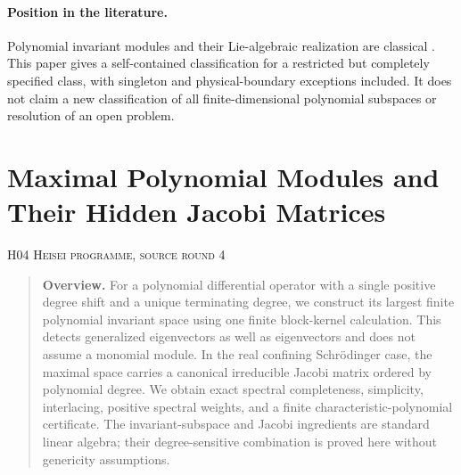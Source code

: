 \documentclass[11pt,a4paper]{article}
\theoremstyle{definition}\newtheorem{definition}[theorem]{Definition}
\theoremstyle{remark}\newtheorem{remark}[theorem]{Remark}
\numberwithin{equation}{section}
\begin{document}
\paragraph{Position in the literature.} Polynomial invariant modules and their Lie-algebraic realization are classical \cite{ref083,ref084}. This paper gives a self-contained classification for a restricted but completely specified class, with singleton and physical-boundary exceptions included. It does not claim a new classification of all finite-dimensional polynomial subspaces or resolution of an open problem.




\clearpage
\section[H04 --- Maximal Polynomial Modules and Their Hidden Jacobi Matrices]{Maximal Polynomial Modules and Their Hidden Jacobi Matrices}\label{contrib-H04}
\noindent\textsc{H04 \quad Heisei programme, source round 4}\par\medskip






\begin{quote}\small\textbf{Overview.} For a polynomial differential operator with a single positive degree shift and a unique terminating degree, we construct its largest finite polynomial invariant space using one finite block-kernel calculation. This detects generalized eigenvectors as well as eigenvectors and does not assume a monomial module. In the real confining Schr\"odinger case, the maximal space carries a canonical irreducible Jacobi matrix ordered by polynomial degree. We obtain exact spectral completeness, simplicity, interlacing, positive spectral weights, and a finite characteristic-polynomial certificate. The invariant-subspace and Jacobi ingredients are standard linear algebra; their degree-sensitive combination is proved here without genericity assumptions.\end{quote}
\end{document}
